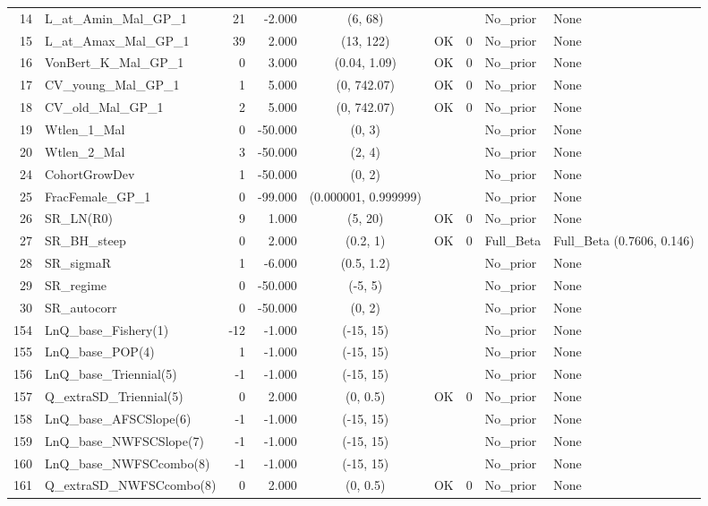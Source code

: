 \documentclass[12pt,]{article}
\begin{document}
\begin{landscape}
\begin{longtable}{rlrrcccll}
  14 & L\_at\_Amin\_Mal\_GP\_1 & 21 & -2.000 & (6, 68) &  &  & No\_prior & None \\ 
  15 & L\_at\_Amax\_Mal\_GP\_1 & 39 & 2.000 & (13, 122) & OK & 0 & No\_prior & None \\ 
  16 & VonBert\_K\_Mal\_GP\_1 & 0 & 3.000 & (0.04, 1.09) & OK & 0 & No\_prior & None \\ 
  17 & CV\_young\_Mal\_GP\_1 & 1 & 5.000 & (0, 742.07) & OK & 0 & No\_prior & None \\ 
  18 & CV\_old\_Mal\_GP\_1 & 2 & 5.000 & (0, 742.07) & OK & 0 & No\_prior & None \\ 
  19 & Wtlen\_1\_Mal & 0 & -50.000 & (0, 3) &  &  & No\_prior & None \\ 
  20 & Wtlen\_2\_Mal & 3 & -50.000 & (2, 4) &  &  & No\_prior & None \\ 
  24 & CohortGrowDev & 1 & -50.000 & (0, 2) &  &  & No\_prior & None \\ 
  25 & FracFemale\_GP\_1 & 0 & -99.000 & (0.000001, 0.999999) &  &  & No\_prior & None \\ 
  26 & SR\_LN(R0) & 9 & 1.000 & (5, 20) & OK & 0 & No\_prior & None \\ 
  27 & SR\_BH\_steep & 0 & 2.000 & (0.2, 1) & OK & 0 & Full\_Beta & Full\_Beta (0.7606, 0.146) \\ 
  28 & SR\_sigmaR & 1 & -6.000 & (0.5, 1.2) &  &  & No\_prior & None \\ 
  29 & SR\_regime & 0 & -50.000 & (-5, 5) &  &  & No\_prior & None \\ 
  30 & SR\_autocorr & 0 & -50.000 & (0, 2) &  &  & No\_prior & None \\ 
  154 & LnQ\_base\_Fishery(1) & -12 & -1.000 & (-15, 15) &  &  & No\_prior & None \\ 
  155 & LnQ\_base\_POP(4) & 1 & -1.000 & (-15, 15) &  &  & No\_prior & None \\ 
  156 & LnQ\_base\_Triennial(5) & -1 & -1.000 & (-15, 15) &  &  & No\_prior & None \\ 
  157 & Q\_extraSD\_Triennial(5) & 0 & 2.000 & (0, 0.5) & OK & 0 & No\_prior & None \\ 
  158 & LnQ\_base\_AFSCSlope(6) & -1 & -1.000 & (-15, 15) &  &  & No\_prior & None \\ 
  159 & LnQ\_base\_NWFSCSlope(7) & -1 & -1.000 & (-15, 15) &  &  & No\_prior & None \\ 
  160 & LnQ\_base\_NWFSCcombo(8) & -1 & -1.000 & (-15, 15) &  &  & No\_prior & None \\ 
  161 & Q\_extraSD\_NWFSCcombo(8) & 0 & 2.000 & (0, 0.5) & OK & 0 & No\_prior & None \\ 

\end{longtable}
\end{landscape}
\end{document}
